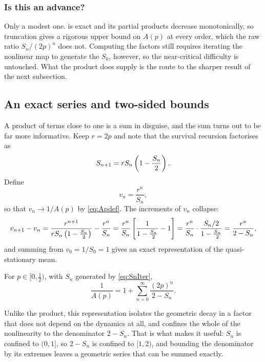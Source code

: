 \subsubsection*{Is this an advance?}

Only a modest one.  is exact and its partial products decrease
monotonically, so truncation gives a rigorous upper bound on $A(p)$ at every order, which
the raw ratio $S_n/(2p)^n$ does not. Computing the factors still requires iterating the
nonlinear map to generate the $S_k$, however, so the near-critical difficulty is
untouched. What the product does supply is the route to the sharper result of the next
subsection.

\subsection{An exact series and two-sided bounds}
\label{sec:Abounds}

A product of terms close to one is a sum in disguise, and the sum turns out to be far
more informative. Keep $r=2p$ and note that the survival recursion factorises as
\begin{equation*}
S_{n+1} = rS_n\left(1-\frac{S_n}{2}\right) .
\end{equation*}
Define
\begin{equation*}
v_n = \frac{r^n}{S_n},
\end{equation*}
so that $v_n\to1/A(p)$ by \cref{eq:Apdef}. The increments of $v_n$ collapse:
\begin{equation*}
v_{n+1}-v_n
= \frac{r^{n+1}}{rS_n\left(1-\frac{S_n}{2}\right)} - \frac{r^n}{S_n}
= \frac{r^n}{S_n}\left[\frac{1}{1-\frac{S_n}{2}}-1\right]
= \frac{r^n}{S_n}\cdot\frac{S_n/2}{1-\frac{S_n}{2}}
= \frac{r^n}{2-S_n},
\end{equation*}
and summing from $v_0 = 1/S_0 = 1$ gives an exact representation of the quasi-stationary
mean.

\begin{proposition}
\label{prop:series}
For $p\in[0,\tfrac12)$, with $S_n$ generated by \cref{eq:SnIter},
\begin{equation}
\label{eq:Aseries}
\frac{1}{A(p)} = 1 + \sum_{n=0}^{\infty}\frac{(2p)^n}{2-S_n} .
\end{equation}
\end{proposition}

\noindent
Unlike the product, this representation isolates the geometric decay in a factor that
does not depend on the dynamics at all, and confines the whole of the nonlinearity to the
denominator $2-S_n$. That is what makes it useful: $S_n$ is confined to $(0,1]$, so
$2-S_n$ is confined to $[1,2)$, and bounding the denominator by its extremes leaves a
geometric series that can be summed exactly.

